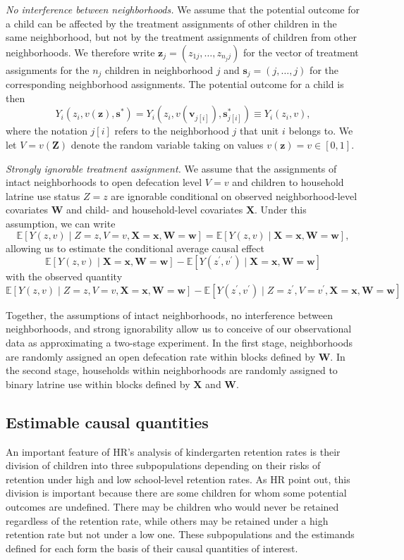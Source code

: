 \documentclass[11pt,a4paper]{article}
\begin{document}
\textit{No interference between neighborhoods.} We assume that the potential outcome for a child can be affected by the treatment assignments of other children in the same neighborhood, but not by the treatment assignments of children from other neighborhoods. We therefore write $\mathbf{z}_j = (z_{1j}, \ldots, z_{n_j j})$ for the vector of treatment assignments for the $n_j$ children in neighborhood $j$ and $\mathbf{s}_j = (j, \ldots, j)$ for the corresponding neighborhood assignments. The potential outcome for a child is then
\[
	Y_i(z_i, v(\mathbf{z}), \mathbf{s}^*) = Y_i(z_i, v(\mathbf{v}_{j[i]}), \mathbf{s}_{j[i]}^*) \equiv Y_i(z_i, v),
\]
where the notation $j[i]$ refers to the neighborhood $j$ that unit $i$ belongs to. We let $V = v(\mathbf{Z})$ denote the random variable taking on values $v(\mathbf{z}) = v \in [0, 1]$.

\textit{Strongly ignorable treatment assignment.} We assume that the assignments of intact neighborhoods to open defecation level $V=v$ and children to household latrine use status $Z=z$ are ignorable conditional on observed neighborhood-level covariates $\mathbf{W}$ and child- and household-level covariates $\mathbf{X}$. Under this assumption, we can write
\[
	\mathbb{E}[Y(z,v) \mid Z=z, V=v, \mathbf{X} = \mathbf{x}, \mathbf{W} = \mathbf{w}] = \mathbb{E}[Y(z,v) \mid \mathbf{X} = \mathbf{x}, \mathbf{W} = \mathbf{w}],
\]
allowing us to estimate the conditional average causal effect
\[
	\mathbb{E}[Y(z,v) \mid \mathbf{X} = \mathbf{x}, \mathbf{W} = \mathbf{w}] - \mathbb{E}[Y(z^{\prime},v^{\prime}) \mid \mathbf{X} = \mathbf{x}, \mathbf{W} = \mathbf{w}]
\]
with the observed quantity
\[
	\mathbb{E}[Y(z,v) \mid Z=z, V=v, \mathbf{X} = \mathbf{x}, \mathbf{W} = \mathbf{w}] - \mathbb{E}[Y(z^{\prime},v^{\prime}) \mid Z=z^{\prime}, V=v^{\prime}, \mathbf{X} = \mathbf{x}, \mathbf{W} = \mathbf{w}]
\]

Together, the assumptions of intact neighborhoods, no interference between neighborhoods, and strong ignorability allow us to conceive of our observational data as approximating a two-stage experiment. In the first stage, neighborhoods are randomly assigned an open defecation rate within blocks defined by $\mathbf{W}$. In the second stage, households within neighborhoods are randomly assigned to binary latrine use within blocks defined by $\mathbf{X}$ and $\mathbf{W}$.

\subsection{Estimable causal quantities}
An important feature of HR's analysis of kindergarten retention rates is their division of children into three subpopulations depending on their risks of retention under high and low school-level retention rates. As HR point out, this division is important because there are some children for whom some potential outcomes are undefined. There may be children who would never be retained regardless of the retention rate, while others may be retained under a high retention rate but not under a low one. These subpopulations and the estimands defined for each form the basis of their causal quantities of interest.
\end{document}
